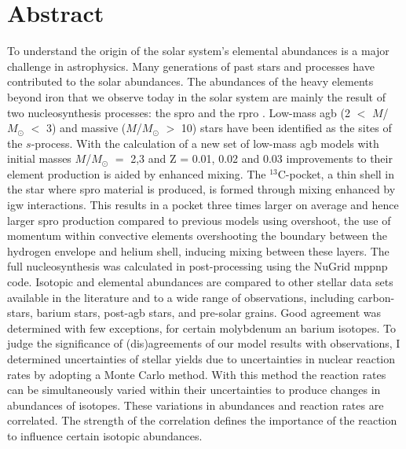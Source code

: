 \chapter{Abstract}

To understand the origin of the solar system's elemental abundances is a major challenge in astrophysics. Many generations of past stars and processes have contributed to the solar abundances. The abundances of the heavy elements beyond iron that we observe today in the solar system are mainly the result of two nucleosynthesis processes: the \acrfull{spro} and the \acrfull{rpro} . Low-mass \acrfull{agb} (2 $<$ $M$/$M_\odot$ $<$ 3) and massive ($M$/$M_\odot$ $>$ 10) stars have been identified as the sites of the $s$-process. With the calculation of a new set of low-mass \acrshort{agb} models with initial masses $M$/$M_\odot$ $=$ 2,3 and Z = 0.01, 0.02 and 0.03 improvements to their element production is aided by enhanced mixing. The $^{13}$C-pocket, a thin shell in the star where \acrshort{spro} material is produced, is formed through mixing enhanced by \acrfull{igw} interactions. This results in a pocket three times larger on average and hence larger \acrshort{spro} production compared to previous models using overshoot, the use of momentum within convective elements overshooting the boundary between the hydrogen envelope and helium shell, inducing mixing between these layers. The full nucleosynthesis was calculated in post-processing using the NuGrid mppnp code. Isotopic and elemental abundances are compared to other stellar data sets available in the literature and to a wide range of observations, including carbon-stars, barium stars, post-\acrshort{agb} stars, and pre-solar grains. Good agreement was determined with few exceptions, for certain molybdenum an barium isotopes. To judge the significance of (dis)agreements of our model results with observations, I determined uncertainties of stellar yields due to uncertainties in nuclear reaction rates by adopting a Monte Carlo method. With this method the reaction rates can be simultaneously varied within their uncertainties to produce changes in abundances of isotopes. These variations in abundances and reaction rates are correlated. The strength of the correlation defines the importance of the reaction to influence certain isotopic abundances. 
